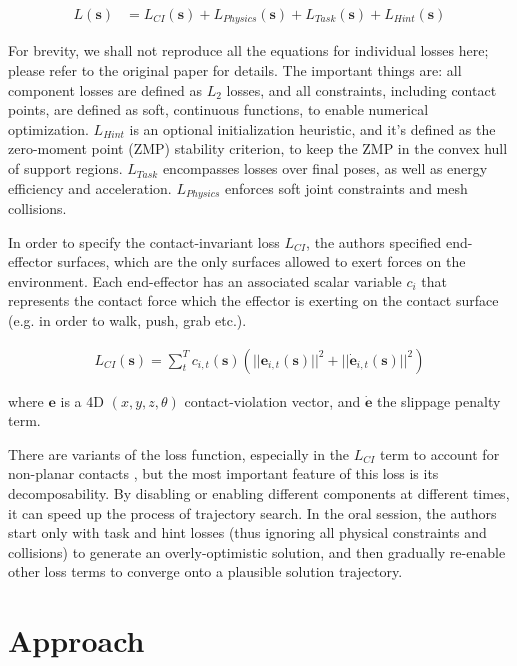 \documentclass{article}
\newcommand{\bvec}[1]{\boldsymbol{#1}}
\newcommand{\dbvec}[1]{\dot{\boldsymbol{#1}}}
\begin{document}
\begin{align*}
L(\bvec{s}) &= L_{CI}(\bvec{s}) + L_{Physics}(\bvec{s}) + L_{Task}(\bvec{s}) + L_{Hint}(\bvec{s})
\end{align*}

For brevity, we shall not reproduce all the equations for individual losses here; please refer to the original paper for details. The important things are: all component losses are defined as $L_2$ losses, and all constraints, including contact points, are defined as soft, continuous functions, to enable numerical optimization. $L_{Hint}$ is an optional initialization heuristic, and it's defined as the zero-moment point (ZMP) stability criterion, to keep the ZMP in the convex hull of support regions. $L_{Task}$ encompasses losses over final poses, as well as energy efficiency and acceleration. $L_{Physics}$ enforces soft joint constraints and mesh collisions.

In order to specify the contact-invariant loss $L_{CI}$, the authors specified end-effector surfaces, which are the only surfaces allowed to exert forces on the environment. Each end-effector has an associated scalar variable $c_i$ that represents the contact force which the effector is exerting on the contact surface (e.g. in order to walk, push, grab etc.).

\begin{align*}
	L_{CI}(\bvec{s}) = \sum_{t}^{T}c_{i,t}(\bvec{s}) (||\bvec{e}_{i,t}(\bvec{s})||^2 + ||\dbvec{e}_{i,t}(\bvec{s})||^2 )
\end{align*}

where $\bvec{e}$ is a 4D $(x,y,z,\theta)$ contact-violation vector, and $\dbvec{e}$ the slippage penalty term.

There are variants of the loss function, especially in the $L_{CI}$ term to account for non-planar contacts \cite{mordatch2012contact}, but the most important feature of this loss is its decomposability. By disabling or enabling different components at different times, it can speed up the process of trajectory search. In the oral session, the authors start only with task and hint losses (thus ignoring all physical constraints and collisions) to generate an overly-optimistic solution, and then gradually re-enable other loss terms to converge onto a plausible solution trajectory.

\section{Approach}
\end{document}
